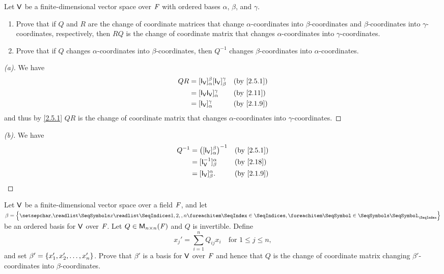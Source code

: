 \begin{ex}\label{ex:2.5.11}
	Let \(\mathsf{V}\) be a finite-dimensional vector space over \(\mathit{F}\) with ordered bases \(\alpha\), \(\beta\), and \(\gamma\).
	\begin{enumerate}
		\item Prove that if \(Q\) and \(R\) are the change of coordinate matrices that change \(\alpha\)-coordinates into \(\beta\)-coordinates and \(\beta\)-coordinates into \(\gamma\)-coordinates, respectively, then \(RQ\) is the change of coordinate matrix that changes \(\alpha\)-coordinates into \(\gamma\)-coordinates.
		\item Prove that if \(Q\) changes \(\alpha\)-coordinates into \(\beta\)-coordinates, then \(Q^{-1}\) changes \(\beta\)-coordinates into \(\alpha\)-coordinates.
	\end{enumerate}
\end{ex}

\begin{proof}[(a)]
	We have
	\begin{align*}
		QR & = [\IT[\V]]_{\alpha}^{\beta} [\IT[\V]]_{\beta}^{\gamma} &  & \by{2.5.1} \\
		   & = [\IT[\V] \IT[\V]]_{\alpha}^{\gamma}                   &  & \by{2.11}  \\
		   & = [\IT[\V]]_{\alpha}^{\gamma}                           &  & \by{2.1.9}
	\end{align*}
	and thus by \cref{2.5.1} \(QR\) is the change of coordinate matrix that changes \(\alpha\)-coordinates into \(\gamma\)-coordinates.
\end{proof}

\begin{proof}[(b)]
	We have
	\begin{align*}
		Q^{-1} & = \pa{[\IT[\V]]_{\alpha}^{\beta}}^{-1} &  & \by{2.5.1} \\
		       & = [\IT[\V]^{-1}]_{\beta}^{\alpha}      &  & \by{2.18}  \\
		       & = [\IT[\V]]_{\beta}^{\alpha}.          &  & \by{2.1.9}
	\end{align*}
\end{proof}

\setcounter{ex}{12}
\begin{ex}\label{ex:2.5.13}
	Let \(\mathsf{V}\) be a finite-dimensional vector space over a field \(\mathit{F}\), and let \(\beta = \set{\seq{x}{1,2,,n}}\) be an ordered basis for \(\mathsf{V}\) over \(\mathit{F}\).
	Let \(Q \in \ms[n][n][\F]\) and \(Q\) is invertible.
	Define
	\[
		x_j' = \sum_{i = 1}^n Q_{i j} x_i \quad \text{for } 1 \leq j \leq n,
	\]
	and set \(\beta' = \left\lbrace x_1', x_2', \dots, x_n'\right\rbrace\).
	Prove that \(\beta'\) is a basis for \(\mathsf{V}\) over \(\mathit{F}\) and hence that \(Q\) is the change of coordinate matrix changing \(\beta'\)-coordinates into \(\beta\)-coordinates.
\end{ex}

